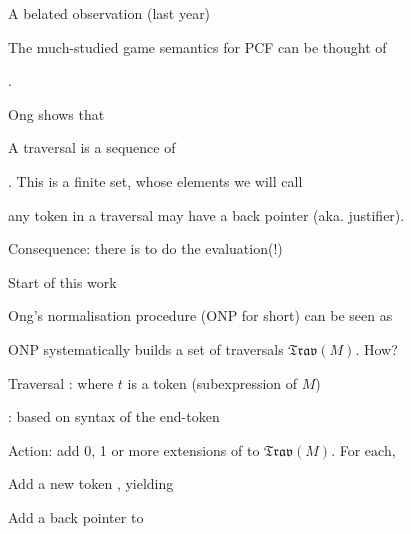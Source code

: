 \documentclass[12pt,fleqn,landscape]{article}
\begin{document}

\begin{slide}{A  belated  observation (last year)}

The much-studied game semantics for PCF can be thought of 

.
\vair

\bc
Ong \cite{ong2015} shows that
\ec
\vair


\bq
{}
\vair\vair

A traversal is a sequence of 
\vair
\bi
\item {}. This is a finite set, whose elements we will call 
\vair

\item any token in a traversal may have a back pointer (aka. justifier).
\ei
\eq

\vair\vair


Consequence: there is  to do the evaluation(!)
\vair

\hfill{}
\end{slide}


\begin{slide}{Start of this work}



Ong's normalisation procedure (ONP for short) can be seen as  
\vair

\bc{}
\ec
\vair



\bi

\item ONP systematically builds a set  of traversals $\mathfrak{Trav}(M)$. How?
\vair\vair

\item Traversal : \hfill {} \hair where $t$ is a token (subexpression  of $M$)
\vair\vair

\item  {}: based on syntax of the end-token 
\vair
\item Action: add  0, 1 or more extensions of  to  $\mathfrak{Trav}(M)$. For each,
\vair
\bi 
\item Add a new token , yielding 
\vair

\item Add a back pointer to  \hfill {}
\ei
 \ei


\end{slide}
\end{document}
